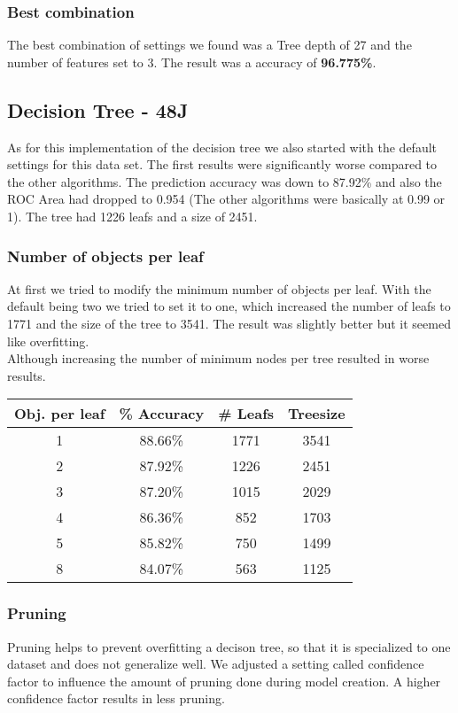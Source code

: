 \documentclass{article}
\begin{document}
\subsubsection{Best combination}
The best combination of settings we found was a Tree depth of 27 and the number of features set to 3. The result was a accuracy of \textbf{96.775\%}.
\subsection{Decision Tree - 48J}
As for this implementation of the decision tree we also started with the default settings for this data set. The first results were significantly worse compared to the other algorithms. The prediction accuracy was down to 87.92\% and also the ROC Area had dropped to 0.954 (The other algorithms were basically at 0.99 or 1). The tree had 1226 leafs and a size of 2451.
\subsubsection{Number of objects per leaf}
At first we tried to modify the minimum number of objects per leaf. With the default being two we tried to set it to one, which increased the number of leafs to 1771 and the size of the tree to 3541. The result was slightly better but it seemed like overfitting. \\
Although increasing the number of minimum nodes per tree resulted in worse results.\\

\begin{center}
\begin{tabular}{ c | c | c | c}
\textbf{Obj. per leaf} & \textbf{\% Accuracy} & \textbf{\# Leafs} & \textbf{Treesize}\\
\hline
1 & 88.66\% & 1771 & 3541\\
2 & 87.92\% & 1226 & 2451\\
3 & 87.20\% & 1015 & 2029\\
4 & 86.36\% & 852 & 1703\\
5 & 85.82\% & 750 & 1499\\
8 & 84.07\% & 563 & 1125\\
\end{tabular}
\end{center}

\subsubsection{Pruning}
Pruning helps to prevent overfitting a decison tree, so that it is specialized to one dataset and does not generalize well. We adjusted a setting called confidence factor to influence the amount of pruning done during model creation. A higher confidence factor results in less pruning.
\end{document}
